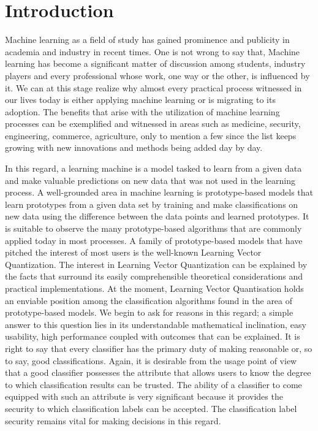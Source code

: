 
\chapter{Introduction}

Machine learning as a field of study has gained prominence and publicity in academia and industry in recent times. One is not wrong to say that, Machine learning has become a significant matter of discussion among students, industry players and every professional whose work, one way or the other, is influenced by it. We can at this stage realize why almost every practical process witnessed in our lives today is either applying machine learning or is migrating to its adoption. The benefits that arise with the utilization of machine learning processes can be exemplified and witnessed in areas such as medicine, security, engineering, commerce, agriculture, only to mention a few since the list keeps growing with new innovations and methods being added day by day. 

In this regard, a learning machine is a model tasked to learn from a given data and make valuable predictions on new data that was not used in the learning process. A well-grounded area in machine learning is prototype-based models that learn prototypes from a given data set by training and make classifications on new data using the difference between the data points and learned prototypes. It is suitable to observe the many prototype-based algorithms that are commonly applied today in most processes.  A family of prototype-based models that have pitched the interest of most users is the well-known Learning Vector Quantization. The interest in Learning Vector Quantization can be explained by the facts that surround its easily comprehensible theoretical considerations and practical implementations. At the moment, Learning Vector Quantisation holds an enviable position among the classification algorithms found in the area of prototype-based models.  We begin to ask for reasons in this regard; a simple answer to this question lies in its understandable mathematical inclination, easy usability, high performance coupled with outcomes that can be explained. It is right to say that every classifier has the primary duty of making reasonable or, so to say, good classifications. Again, it is desirable from the usage point of view that a good classifier possesses the attribute that allows users to know the degree to which classification results can be trusted. The ability of a classifier to come equipped with such an attribute is very significant because it provides the security to which classification labels can be accepted. The classification label security remains vital for making decisions in this regard.


